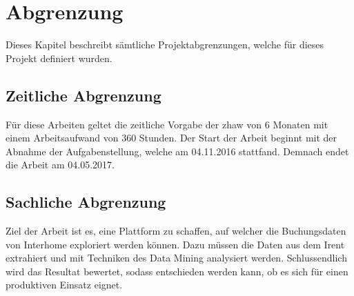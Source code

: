 %
	
					
					
					



\section{Abgrenzung}
\label{sec:einleitung:abgrenzung}
Dieses Kapitel beschreibt sämtliche Projektabgrenzungen, welche für dieses Projekt definiert
wurden.

\subsection{Zeitliche Abgrenzung}
Für diese Arbeiten geltet die zeitliche Vorgabe der \gls{zhaw} von 6 Monaten mit einem Arbeitsaufwand von 360 Stunden.
Der Start der Arbeit beginnt mit der Abnahme der Aufgabenstellung, welche am 04.11.2016 stattfand.
Demnach endet die Arbeit am 04.05.2017.

\subsection{Sachliche Abgrenzung}
Ziel der Arbeit ist es, eine Plattform zu schaffen, auf welcher die Buchungsdaten von Interhome exploriert werden können. Dazu müssen die Daten aus dem Irent extrahiert und mit Techniken des Data Mining analysiert werden. Schlussendlich wird das Resultat bewertet, sodass entschieden werden kann, ob es sich für einen produktiven Einsatz eignet.

